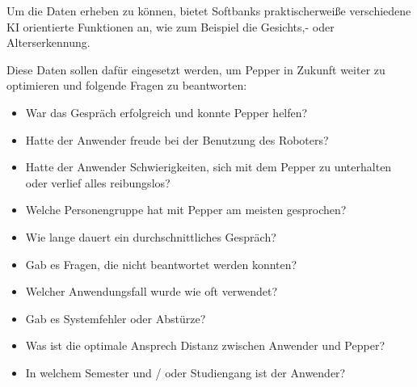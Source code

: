Um die Daten erheben zu können, bietet Softbanks praktischerweiße verschiedene KI orientierte Funktionen an, wie zum Beispiel die Gesichts,- oder Alterserkennung.

Diese Daten sollen dafür eingesetzt werden, um Pepper in Zukunft weiter zu optimieren und folgende Fragen zu beantworten:
\begin{itemize}
    \item War das Gespräch erfolgreich und konnte Pepper helfen?
    \item Hatte der Anwender freude bei der Benutzung des Roboters?
    \item Hatte der Anwender Schwierigkeiten, sich mit dem Pepper zu unterhalten oder verlief alles reibungslos?
    \item Welche Personengruppe hat mit Pepper am meisten gesprochen?
    \item Wie lange dauert ein durchschnittliches Gespräch?
    \item Gab es Fragen, die nicht beantwortet werden konnten?
    \item Welcher Anwendungsfall wurde wie oft verwendet?
    \item Gab es Systemfehler oder Abstürze?
    \item Was ist die optimale Ansprech Distanz zwischen Anwender und Pepper?
    \item In welchem Semester und / oder Studiengang ist der Anwender?
\end{itemize}

%
%
%
%

